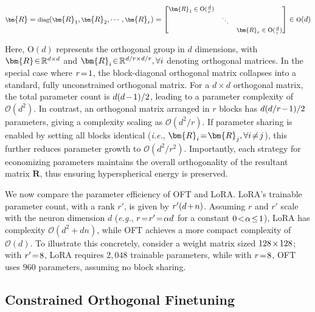 \begin{equation}
    \footnotesize
    \bm{R}=\text{diag}(\bm{R}_1,\bm{R}_2,\cdots,\bm{R}_r)=\begin{bmatrix}
    \bm{R}_1\in \text{O}(\frac{d}{r}) &  &\\
    &\ddots & \\
    & & \bm{R}_r\in \text{O}(\frac{d}{r})
    \end{bmatrix}\in \text{O}(d)
\end{equation}

Here, $\text{O}(d)$ represents the orthogonal group in $d$ dimensions, with $\thickmuskip=2mu \medmuskip=2mu \bm{R}\in\mathbb{R}^{d\times d}$ and $\thickmuskip=2mu \medmuskip=2mu \bm{R}_i\in\mathbb{R}^{d/r\times d/r},\forall i$ denoting orthogonal matrices. In the special case where $\thickmuskip=2mu \medmuskip=2mu r=1$, the block-diagonal orthogonal matrix collapses into a standard, fully unconstrained orthogonal matrix. For a $d\times d$ orthogonal matrix, the total parameter count is $\thickmuskip=2mu \medmuskip=2mu d(d-1)/2$, leading to a parameter complexity of $\mathcal{O}(d^2)$. In contrast, an orthogonal matrix arranged in $r$ blocks has $\thickmuskip=2mu \medmuskip=2mu d(d/r-1)/2$ parameters, giving a complexity scaling as $\mathcal{O}(d^2/r)$. If parameter sharing is enabled by setting all blocks identical (\emph{i.e.}, $\thickmuskip=2mu \medmuskip=2mu \bm{R}_i=\bm{R}_j,\forall i\neq j$), this further reduces parameter growth to $\mathcal{O}(d^2/r^2)$. Importantly, each strategy for economizing parameters maintains the overall orthogonality of the resultant matrix $\bm{R}$, thus ensuring hyperspherical energy is preserved.

We now compare the parameter efficiency of OFT and LoRA. LoRA’s trainable parameter count, with a rank $r'$, is given by $\thickmuskip=2mu \medmuskip=2mu r'(d+n)$. Assuming $r$ and $r'$ scale with the neuron dimension $d$ (\emph{e.g.}, $\thickmuskip=2mu \medmuskip=2mu r=r'=\alpha d$ for a constant $\thickmuskip=2mu \medmuskip=2mu 0<\alpha\leq 1$), LoRA has complexity $\mathcal{O}(d^2+dn)$, while OFT achieves a more compact complexity of $\mathcal{O}(d)$. To illustrate this concretely, consider a weight matrix sized $\thickmuskip=2mu \medmuskip=2mu 128\times 128$; with $\thickmuskip=2mu \medmuskip=2mu r'=8$, LoRA requires $2,048$ trainable parameters, while with $\thickmuskip=2mu \medmuskip=2mu r=8$, OFT uses $960$ parameters, assuming no block sharing.

\subsection{Constrained Orthogonal Finetuning}

